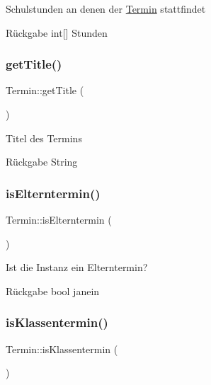 Schulstunden an denen der \mbox{\hyperlink{interface_termin}{Termin}} stattfindet \begin{DoxyReturn}{Rückgabe}
int\mbox{[}\mbox{]} Stunden 
\end{DoxyReturn}
\mbox{\label{interface_termin_a2fca19815ee61713254ac18782205feb}} 
\subsubsection{\texorpdfstring{get\+Title()}{getTitle()}}
{\footnotesize\ttfamily Termin\+::get\+Title (\begin{DoxyParamCaption}{ }\end{DoxyParamCaption})}

Titel des Termins \begin{DoxyReturn}{Rückgabe}
String 
\end{DoxyReturn}
\mbox{\label{interface_termin_a120ec73226cde99fbd20fbf8c2162604}} 
\subsubsection{\texorpdfstring{is\+Elterntermin()}{isElterntermin()}}
{\footnotesize\ttfamily Termin\+::is\+Elterntermin (\begin{DoxyParamCaption}{ }\end{DoxyParamCaption})}

Ist die Instanz ein Elterntermin? \begin{DoxyReturn}{Rückgabe}
bool janein 
\end{DoxyReturn}
\mbox{\label{interface_termin_aab8e358f66111c5075f20bd0938497f5}} 
\subsubsection{\texorpdfstring{is\+Klassentermin()}{isKlassentermin()}}
{\footnotesize\ttfamily Termin\+::is\+Klassentermin (\begin{DoxyParamCaption}{ }\end{DoxyParamCaption})}


